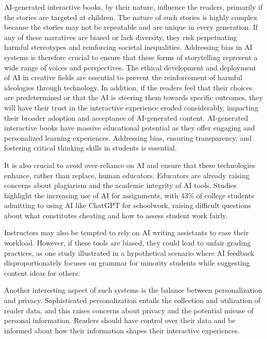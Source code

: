 \documentclass[conference]{IEEEtran}
\begin{document}
	
	AI-generated interactive books, by their nature, influence the readers, primarily if the stories are targeted at children\cite{salazar2024generative}. The nature of such stories is highly complex because the stories may not be repeatable and are unique in every generation.   If any of these narratives are biased or lack diversity, they risk perpetuating harmful stereotypes and reinforcing societal inequalities. Addressing bias in AI systems is therefore crucial to ensure that these forms of storytelling represent a wide range of voices and perspectives. The ethical development and deployment of AI in creative fields are essential to prevent the reinforcement of harmful ideologies through technology. In addition, if the readers feel that their choices are predetermined or that the AI is steering them towards specific outcomes, they will have their trust in the interactive experience eroded considerably, impacting their broader adoption and acceptance of AI-generated content. AI-generated interactive books have massive educational potential as they offer engaging and personalized learning experiences. Addressing bias, ensuring transparency, and fostering critical thinking skills in students is essential. 
	
	It is also crucial to avoid over-reliance on AI and ensure that these technologies enhance, rather than replace, human educators\cite{salazar2024generative}. Educators are already raising concerns about plagiarism and the academic integrity of AI tools. Studies\cite{delello2023exploring} highlight the increasing use of AI for assignments, with 43\% of college students admitting to using AI like ChatGPT for schoolwork, raising difficult questions about what constitutes cheating and how to assess student work fairly.
	
	Instructors may also be tempted to rely on AI writing assistants to ease their workload. However, if these tools are biased, they could lead to unfair grading practices, as one study illustrated in a hypothetical scenario where AI feedback disproportionately focuses on grammar for minority students while suggesting content ideas for others\cite{salazar2024generative}.
	
	Another interesting aspect of such systems is the balance between personalization and privacy\cite{kutty2021personalization}. Sophisticated personalization entails the collection and utilization of reader data, and this raises concerns about privacy and the potential misuse of personal information. Readers should have control over their data and be informed about how their information shapes their interactive experiences.
	
\end{document}
